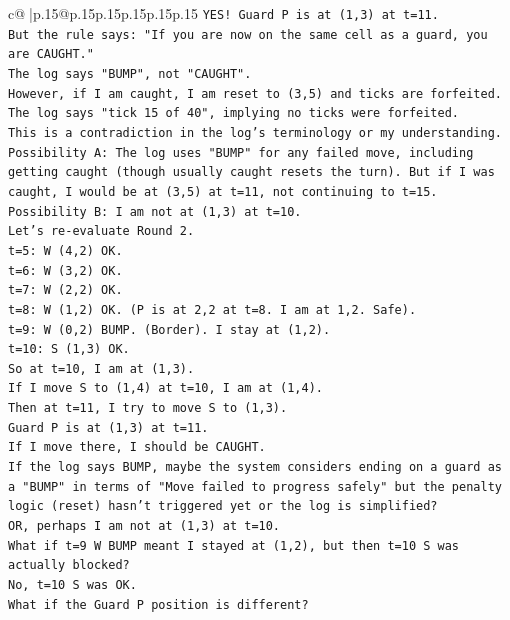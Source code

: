 \documentclass{article}
\begin{document}
{\begin{supertabular}{c@{$\;$}|p{.15\linewidth}@{}p{.15\linewidth}p{.15\linewidth}p{.15\linewidth}p{.15\linewidth}p{.15\linewidth}}
{{{\texttt{YES! Guard P is at (1,3) at t=11.} \\
\texttt{But the rule says: "If you are now on the same cell as a guard, you are CAUGHT."} \\
\texttt{The log says "BUMP", not "CAUGHT".} \\
\texttt{However, if I am caught, I am reset to (3,5) and ticks are forfeited.} \\
\texttt{The log says "tick 15 of 40", implying no ticks were forfeited.} \\
\texttt{This is a contradiction in the log's terminology or my understanding.} \\
\texttt{Possibility A: The log uses "BUMP" for any failed move, including getting caught (though usually caught resets the turn). But if I was caught, I would be at (3,5) at t=11, not continuing to t=15.} \\
\texttt{Possibility B: I am not at (1,3) at t=10.} \\
\texttt{Let's re{-}evaluate Round 2.} \\
\texttt{t=5: W (4,2) OK.} \\
\texttt{t=6: W (3,2) OK.} \\
\texttt{t=7: W (2,2) OK.} \\
\texttt{t=8: W (1,2) OK. (P is at 2,2 at t=8. I am at 1,2. Safe).} \\
\texttt{t=9: W (0,2) BUMP. (Border). I stay at (1,2).} \\
\texttt{t=10: S (1,3) OK.} \\
\texttt{So at t=10, I am at (1,3).} \\
\texttt{If I move S to (1,4) at t=10, I am at (1,4).} \\
\texttt{Then at t=11, I try to move S to (1,3).} \\
\texttt{Guard P is at (1,3) at t=11.} \\
\texttt{If I move there, I should be CAUGHT.} \\
\texttt{If the log says BUMP, maybe the system considers ending on a guard as a "BUMP" in terms of "Move failed to progress safely" but the penalty logic (reset) hasn't triggered yet or the log is simplified?} \\
\texttt{OR, perhaps I am not at (1,3) at t=10.} \\
\texttt{What if t=9 W BUMP meant I stayed at (1,2), but then t=10 S was actually blocked?} \\
\texttt{No, t=10 S was OK.} \\
\texttt{What if the Guard P position is different?} \\
}}}
\end{supertabular}}
\end{document}
